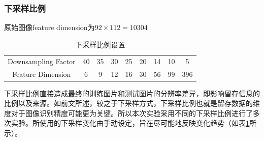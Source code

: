 \documentclass[UTF8]{ctexart}
\begin{document}
\subsubsection{下采样比例}
\begin{table}[htbp]
    \centering
    \caption{下采样比例设置}{原始图像feature dimension为\(92\times 112=10304\)}\label{tab-downsampling_factor}
    \begin{tabular}{ccccccccc}
        \toprule
        Downsampling Factor & 40 & 35 & 30 & 25 & 20 & 14 & 10 & 5 \\
        Feature Dimension & 6 & 9 & 12 & 16 & 30 & 56 & 99 & 396 \\
        \bottomrule
    \end{tabular}
\end{table}
下采样比例直接造成最终的训练图片和测试图片的分辨率差异，即影响留存信息的比例以及来源。如前文所述，较之于下采样方式，下采样比例也就是留存数据的维度对于图像识别精度可能更为关键。所以本次实验采用不同的下采样比例进行了多次实验。所使用的下采样变化由手动设定，旨在尽可能地反映变化趋势（如表\ref{tab-downsampling_factor}所示）。
\end{document}
